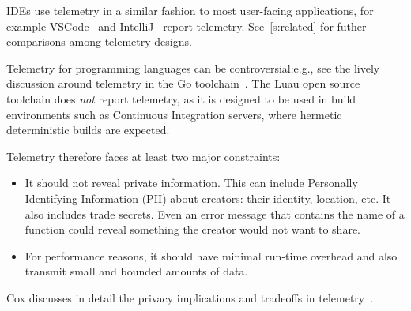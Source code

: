 \documentclass[english,submission,cleveref]{programming}
\begin{document}
IDEs use telemetry in a similar fashion to most user-facing
applications, for example VSCode~\cite{vsc-telemetry} and
IntelliJ~\cite{intellij-telemetry} report telemetry.
See~\cref{s:related} for futher comparisons among telemetry designs.

Telemetry for programming languages can be controversial:e.g., see
the lively discussion around telemetry in the Go
toolchain~\cite{golang-telemetry}. 
The Luau open source toolchain does \emph{not} report telemetry,
as it is designed to be used in build environments such as Continuous Integration
servers, where hermetic deterministic builds are expected.

Telemetry therefore faces at least two major constraints:
\begin{itemize}

\item It should not reveal private information. This can include
  Personally Identifying
  Information (PII) about creators: their identity, location, etc. It also
  includes trade secrets. Even an error message that contains the name
  of a function could reveal something the creator would not want to
  share.

\item For performance reasons, it should have minimal run-time
  overhead and also transmit small and bounded amounts of data.
\end{itemize}
Cox discusses in detail the privacy implications and tradeoffs
in telemetry~\cite{transparent-telemetry}.



\end{document}
